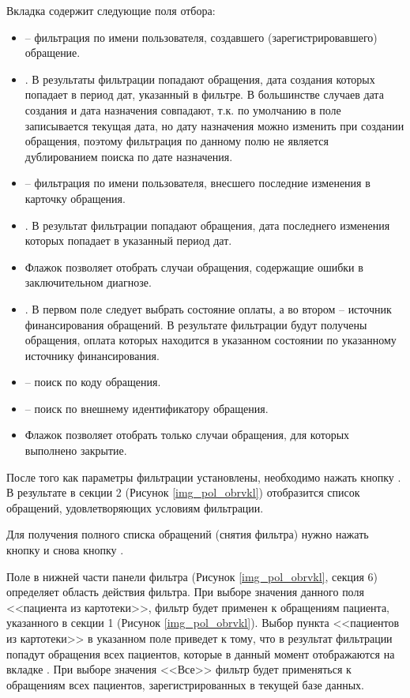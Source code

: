 Вкладка  содержит следующие поля отбора:
\begin{itemize}
 \item {} – фильтрация по имени пользователя, создавшего (зарегистрировавшего) обращение.
 \item {}. В результаты фильтрации попадают обращения, дата создания которых попадает в период дат, указанный в фильтре. В большинстве случаев дата создания и дата назначения совпадают, т.к. по умолчанию в поле  записывается текущая дата, но дату назначения можно изменить при создании обращения, поэтому фильтрация по данному полю не является дублированием поиска по дате назначения.
 \item {} – фильтрация по имени пользователя, внесшего последние изменения в карточку обращения.
 \item {}. В результат фильтрации попадают обращения, дата последнего изменения которых попадает в указанный период дат.
 \item Флажок  позволяет отобрать случаи обращения, содержащие ошибки в заключительном диагнозе.
 \item {}. В первом поле следует выбрать состояние оплаты, а во втором – источник финансирования обращений. В результате фильтрации будут получены обращения, оплата которых находится в указанном состоянии по указанному источнику финансирования.
 \item {} – поиск по коду обращения.
 \item {} – поиск по внешнему идентификатору обращения.
 \item Флажок  позволяет отобрать только случаи обращения, для которых выполнено закрытие.
\end{itemize}
 
После того как параметры фильтрации установлены, необходимо нажать кнопку . В результате в секции 2 (Рисунок \ref{img_pol_obrvkl}) отобразится список обращений, удовлетворяющих условиям фильтрации.

Для получения полного списка обращений (снятия фильтра) нужно нажать кнопку  и снова кнопку .

Поле  в нижней части панели фильтра (Рисунок \ref{img_pol_obrvkl}, секция 6) определяет область действия фильтра. При выборе значения данного поля <<пациента из картотеки>>, фильтр будет применен к обращениям пациента, указанного в секции 1 (Рисунок \ref{img_pol_obrvkl}). Выбор пункта <<пациентов из картотеки>> в указанном поле приведет к тому, что в результат фильтрации попадут обращения всех пациентов, которые в данный момент отображаются на вкладке . При выборе значения <<Все>> фильтр будет применяться к обращениям всех пациентов, зарегистрированных в текущей базе данных.

